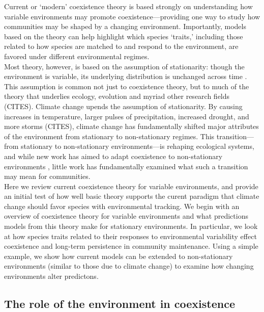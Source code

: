\documentclass[11pt,letterpaper]{article}
\begin{document}
Current or `modern' coexistence theory is based strongly on understanding how variable environments may promote coexistence---providing one way to study how communities may be shaped by a changing environment. Importantly, models based on the theory can help highlight which species `traits,' including those related to how species are matched to and respond to the environment, are favored under different environmental regimes.\\

Most theory, however, is based on the assumption of stationarity: though the environment is variable, its underlying distribution is unchanged across time \citep{barabas2018}. This assumption is common not just to coexistence theory, but to much of the theory that underlies ecology, evolution and myriad other research fields (CITES). Climate change upends the assumption of stationarity. By causing increases in temperature, larger pulses of precipitation, increased drought, and more storms (CITES), climate change has fundamentally shifted major attributes of the environment from stationary to non-stationary regimes. This transition---from stationary to non-stationary environments---is rehaping ecological systems, and while new work has aimed to adapt coexistence to non-stationary environments \citep{chessonnonstat}, little work has fundamentally examined what such a transition may mean for communities. \\

Here we review current coexistence theory for variable environments, and provide an initial test of how well basic theory supports the curent paradigm that climate change should favor species with environmental tracking. We begin with an overview of coexistence theory for variable environments and what predictions models from this theory make for stationary environments. In particular, we look at how species traits related to their responses to environmental variability effect coexistence and long-term persistence in community maintenance. Using a simple example, we show how current models can be extended to non-stationary environments (similar to those due to climate change) to examine how changing environments alter predictons.


\subsection{The role of the environment in coexistence}
\end{document}
